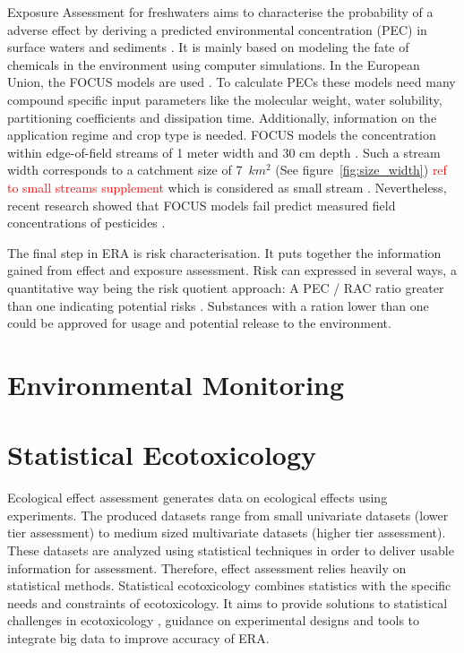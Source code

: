 Exposure Assessment for freshwaters aims to characterise the probability of a adverse effect by deriving a predicted environmental concentration (PEC) in surface waters and sediments \citep{newman_fundamentals_2015}. 
It is mainly based on modeling the fate of chemicals in the environment using computer simulations. 
In the European Union, the FOCUS models are used \citep{focus_focus_2001, efsa_guidance_2013}.
To calculate PECs these models need many compound specific input parameters like the molecular weight, water solubility, partitioning coefficients and dissipation time. 
Additionally, information on the application regime and crop type is needed. 
FOCUS models the concentration within edge-of-field streams of 1 meter width and 30 cm depth \citep{erlacher_regulation_2011}. 
Such a stream width corresponds to a catchment size of 7~$km^2$ (See figure~\ref{fig:size_width}) \textcolor{red}{ref to small streams supplement} which is considered as small stream \citep{lorenz_specifics_2016}. 
Nevertheless, recent research showed that FOCUS models fail predict measured field concentrations of pesticides \citep{knabel_regulatory_2012, knabel_fungicide_2014}. 

The final step in ERA is risk characterisation.
It puts together the information gained from effect and exposure assessment. 
Risk can expressed in several ways, a quantitative way being the risk quotient approach: A PEC / RAC ratio greater than one indicating potential risks \citep{efsa_guidance_2013, suter_ecological_2007, amiard-triquet_aquatic_2015}. 
Substances with a ration lower than one could be approved for usage and potential release to the environment.



\section{Environmental Monitoring}

\section{Statistical Ecotoxicology}
Ecological effect assessment generates data on ecological effects using experiments. 
The produced datasets range from small univariate datasets (lower tier assessment) to medium sized multivariate datasets (higher tier assessment).
These datasets are analyzed using statistical techniques in order to deliver usable information for assessment.
Therefore, effect assessment relies heavily on statistical methods.
Statistical ecotoxicology combines statistics with the specific needs and constraints of ecotoxicology. 
It aims to provide solutions to statistical challenges in ecotoxicology \citep{fox_comment_2016}, guidance on experimental designs \citep{johnson_power_2015} and tools to integrate big data \citep {van_den_brink_new_2016} to improve accuracy of ERA. 

